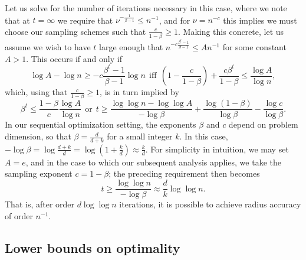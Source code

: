 Let us solve for the number of iterations necessary in this case, where we
note that at $t = \infty$ we require that $\nu^{-\frac{1}{\beta - 1}} \le
n^{-1}$, and for $\nu = n^{-c}$ this implies we must choose our
sampling schemes such that $\frac{c}{1 - \beta} \ge 1$.  Making this
concrete, let us assume we wish to have $t$ large enough that $n^{-c
  \frac{\beta^t - 1}{\beta - 1}} \le A n^{-1}$ for some constant $A >
1$. This occurs if and only if
\begin{equation*}
  \log A - \log n
  \ge -c \frac{\beta^t - 1}{\beta - 1} \log n
  ~~ \mbox{iff} ~~
  \left(1 - \frac{c}{1 - \beta}\right)
  + \frac{c \beta^t}{1 - \beta} \le \frac{\log A}{\log n},
\end{equation*}
which, using that $\frac{c}{1 - \beta} \ge 1$, is in turn implied by
\begin{equation*}
  \beta^t \le \frac{1 - \beta}{c} \frac{\log A}{\log n}
  ~~ \mbox{or} ~~
  t \ge \frac{\log \log n - \log \log A}{-\log \beta}
  + \frac{\log(1 - \beta)}{\log \beta}
  - \frac{\log c}{\log \beta}.
\end{equation*}
In our sequential optimization setting, the exponents $\beta$ and $c$
depend on problem dimension, so that $\beta = \frac{d}{d + k}$ for
a small integer $k$. In this case, $-\log \beta = \log \frac{d + k}{d} =
\log(1 + \frac{k}{d}) \approx \frac{k}{d}$.
For simplicity in intuition, we may set $A = e$, and
in the case to which our subsequent analysis applies, we take the sampling
exponent $c = 1 - \beta$; the preceding requirement then becomes
\begin{equation*}
  t \ge \frac{\log \log n}{-\log \beta} \approx
  \frac{d}{k} \log \log n.
\end{equation*}
That is, after order $d \log \log n$ iterations, it is possible to achieve
radius accuracy of order $n^{-1}$.



\subsection{Lower bounds on optimality}
\label{sec:main-lbidea}

\newcommand{\fndist}{\mathsf{d}_{\rm opt}}


